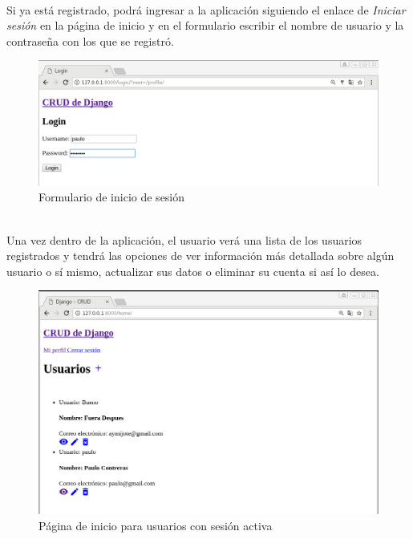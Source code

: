 \documentclass[9pt]{article}
\begin{document}
\\
Si ya está registrado, podrá ingresar a la aplicación siguiendo el enlace de \textit{Iniciar sesión} en la página de inicio y en el formulario escribir el nombre de usuario y la contraseña con los que se registró.
\begin{figure}[h!]
  \centering
  \includegraphics[width=\textwidth]{django_crud/login}
  \caption{Formulario de inicio de sesión}
\end{figure}
\\

Una vez dentro de la aplicación, el usuario verá una lista de los usuarios registrados y tendrá las opciones de ver información más detallada sobre algún usuario o sí mismo, actualizar sus datos o eliminar su cuenta si así lo desea.\\
\begin{figure}[ht!]
  \centering
  \includegraphics[width=\textwidth]{django_crud/home_logged}
  \caption{Página de inicio para usuarios con sesión activa}
\end{figure}
\\
\end{document}
